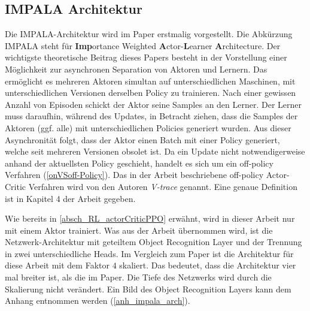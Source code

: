 \subsection{IMPALA Architektur}\label{absch_setup_impala}
Die IMPALA-Architektur wird im Paper \cite{espeholt2018impala} erstmalig vorgestellt. Die Abkürzung IMPALA steht für \textbf{Imp}ortance Weighted \textbf{A}ctor-\textbf{L}earner \textbf{A}rchitecture. Der wichtigste theoretische Beitrag dieses Papers besteht in der Vorstellung einer Möglichkeit zur asynchronen Separation von Aktoren und Lernern. Das ermöglicht es mehreren Aktoren simultan auf unterschiedlichen Maschinen, mit unterschiedlichen Versionen derselben Policy zu trainieren. Nach einer gewissen Anzahl von Episoden schickt der Aktor seine Samples an den Lerner. Der Lerner muss daraufhin, während des Updates, in Betracht ziehen, dass die Samples der Aktoren (ggf. alle) mit unterschiedlichen Policies generiert wurden. Aus dieser Asynchronität folgt, dass der Aktor einen Batch mit einer Policy generiert, welche seit mehreren Versionen obsolet ist. Da ein Update nicht notwendigerweise anhand der aktuellsten Policy geschieht, handelt es sich um ein off-policy Verfahren (\ref{onVSoff-Policy}). Das in der Arbeit \cite{espeholt2018impala} beschriebene off-policy Actor-Critic Verfahren wird von den Autoren \emph{V-trace} genannt. Eine genaue Definition ist in Kapitel 4 der Arbeit \cite{espeholt2018impala} gegeben.

Wie bereits in \ref{absch_RL_actorCriticPPO} erwähnt, wird in dieser Arbeit nur mit einem Aktor trainiert. Was aus der Arbeit \cite{espeholt2018impala} übernommen wird, ist die Netzwerk-Architektur mit geteiltem Object Recognition Layer und der Trennung in zwei unterschiedliche Heads. Im Vergleich zum Paper ist die Architektur für diese Arbeit mit dem Faktor $4$ skaliert. Das bedeutet, dass die Architektur vier mal breiter ist, als die im Paper. Die Tiefe des Netzwerks wird durch die Skalierung nicht verändert. Ein Bild des Object Recognition Layers kann dem Anhang entnommen werden (\ref{anh_impala_arch}).














\newpage